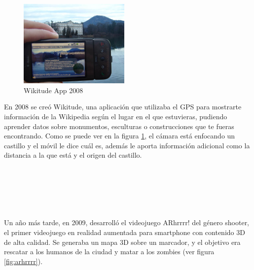 \begin{figure}
    \centering
    \includegraphics[width=0.48\textwidth]{Images/Wikitude_Example.jpeg}
    \caption{Wikitude App 2008}
    \label{fig:wikitude2008}
\end{figure}

En 2008 se creó Wikitude, una aplicación que utilizaba el GPS para mostrarte información de la Wikipedia según el lugar en el que estuvieras, pudiendo aprender datos sobre monumentos, esculturas o construcciones que te fueras encontrando. Como se puede ver en la figura \ref{fig:wikitude2008}, el cámara está enfocando un castillo y el móvil le dice cuál es, además le aporta información adicional como la distancia a la que está y el origen del castillo. \\
\\
\\
\\
\\
\\
\\

Un año más tarde, en 2009, desarrolló el videojuego ARhrrrr! del género shooter, el primer videojuego en realidad aumentada para smartphone con contenido 3D de alta calidad. Se generaba un mapa 3D sobre un marcador, y el objetivo era rescatar a los humanos de la ciudad y matar a los zombies (ver figura \ref{fig:arhrrrr})\cite{ARToolkit}.

